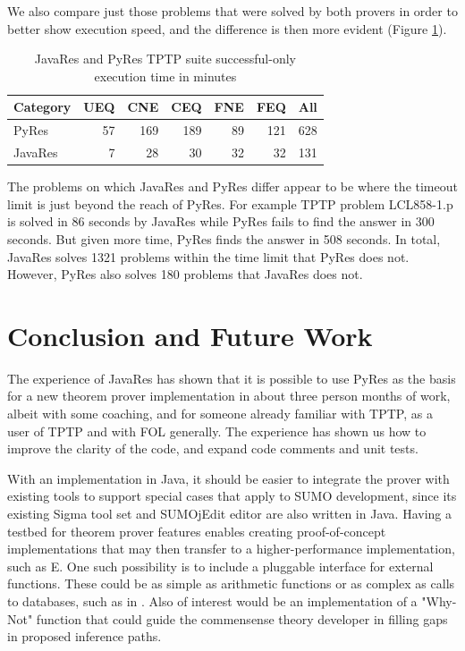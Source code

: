 \documentclass{llncs}
\begin{document}
We also compare just those problems that were solved by both provers in order to better show execution speed,
and the difference is then more evident (Figure \ref{tab:res3}).

\begin{table}[tbh]
  \begin{tabular}{lrrrrrr}
    \hline
    \textbf{Category} & \textbf{UEQ} & \textbf{CNE} & \textbf{CEQ} & \textbf{FNE} & \textbf{FEQ} & \textbf{All}\\
    \hline
    PyRes     &   57 &  169 &   189 &   89 &   121 &  628 \\
    JavaRes   &   7 &   28 &   30 &   32 &   32 &  131 \\
    \hline
  \end{tabular}
  \caption{JavaRes and PyRes TPTP suite successful-only execution time in minutes}
  \label{tab:res3}
\end{table}


The problems on which JavaRes and PyRes differ appear to be where the timeout limit is just beyond
the reach of PyRes.  For example TPTP problem LCL858-1.p is solved in 86 seconds by JavaRes while
PyRes fails to find the answer in 300 seconds.  But given more time, PyRes finds the answer in 508 seconds.
In total, JavaRes solves 1321 problems within the time limit that PyRes does not.  However, PyRes also
solves 180 problems that JavaRes does not.


\section{Conclusion and Future Work}

The experience of JavaRes has shown that it is possible to use PyRes as the basis for a new theorem
prover implementation in about three person months of work, albeit with some coaching, and for
someone already familiar with TPTP, as a user of TPTP and with FOL generally.  The
experience has shown us how to improve the clarity of the code, and expand code comments and unit
tests.

With an implementation in Java, it should be easier to integrate the prover with existing tools to support
special cases that apply to SUMO development, since its existing Sigma tool set \cite{pease2013sigma}
and SUMOjEdit editor \cite{pease2020programmer} are also written in Java.  Having a testbed for theorem
prover features enables creating proof-of-concept implementations
that may then transfer to a higher-performance implementation, such as E.  One such possibility is to
include a pluggable interface for external functions.  These could be as simple as arithmetic functions
or as complex as calls to databases, such as in \cite{DBLP:conf/ki/SudaSWLM09}.  Also of interest would be an implementation
of a "Why-Not" function \cite{10.5555/1650083.1650093} that could guide the commensense theory developer in filling gaps
in proposed inference paths.
\end{document}
